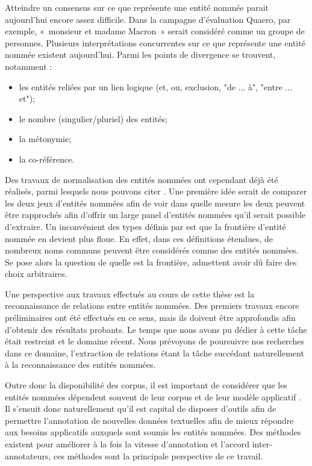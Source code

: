 \documentclass[12pt,a4paper,times,twoside,openright]{report}
\begin{document}
Atteindre un consensus sur ce que représente une entité nommée parait aujourd'hui encore assez difficile. Dans la campagne d'évaluation Quaero, par exemple, «\ monsieur et madame Macron\ » serait considéré comme un groupe de personnes. Plusieurs interprétations concurrentes sur ce que représente une entité nommée existent aujourd'hui. Parmi les points de divergence se trouvent, notamment :
\begin{itemize}
    \item les entités reliées par un lien logique (et, ou, exclusion, "de ... à", "entre ... et");
    \item le nombre (singulier/pluriel) des entités;
    \item la métonymie;
    \item la co-référence.
\end{itemize}

Des travaux de normalisation des entités nommées ont cependant déjà été réalisés, parmi lesquels nous pouvons citer \citet{sekine2002extended,galibert2011structured}. Une première idée serait de comparer les deux jeux d'entités nommées afin de voir dans quelle mesure les deux peuvent être rapprochés afin d'offrir un large panel d'entités nommées qu'il serait possible d'extraire. Un inconvénient des types définis par \citet{sekine2002extended,galibert2011structured} est que la frontière d'entité nommée en devient plus floue. En effet, dans ces définitions étendues, de nombreux noms communs peuvent être considérés comme des entités nommées. Se pose alors la question de quelle est la frontière, \citet{sekine2002extended} admettent avoir dû faire des choix arbitraires.

Une perspective aux travaux effectués au cours de cette thèse est la reconnaissance de relations entre entités nommées. Des premiers travaux encore préliminaires ont été effectués en ce sens, mais ils doivent être approfondis afin d'obtenir des résultats probants. Le temps que nous avons pu dédier à cette tâche était restreint et le domaine récent. Nous prévoyons de poursuivre nos recherches dans ce domaine, l'extraction de relations étant la tâche succédant naturellement à la reconnaissance des entités nommées.

Outre donc la disponibilité des corpus, il est important de considérer que les entités nommées dépendent souvent de leur corpus et de leur modèle applicatif \citep{ehrmann2008entites}. Il s'ensuit donc naturellement qu'il est capital de disposer d'outils afin de permettre l'annotation de nouvelles données textuelles afin de mieux répondre aux besoins applicatifs auxquels sont soumis les entités nommées. Des méthodes existent pour améliorer à la fois la vitesse d'annotation et l'accord inter-annotateurs, ces méthodes sont la principale perspective de ce travail.
\end{document}

